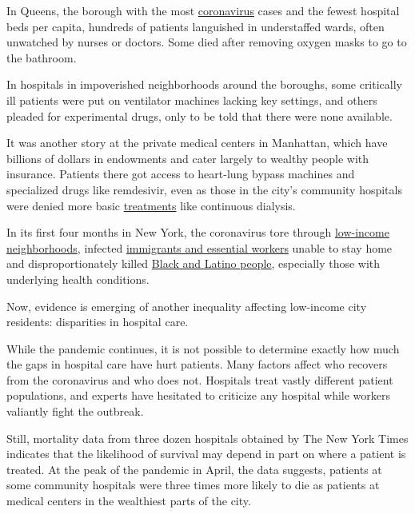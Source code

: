 In Queens, the borough with the most
\href{https://www.nytimes.com/2020/07/27/podcasts/the-daily/new-york-hospitals-covid.html}{coronavirus}
cases and the fewest hospital beds per capita, hundreds of patients
languished in understaffed wards, often unwatched by nurses or doctors.
Some died after removing oxygen masks to go to the bathroom.

In hospitals in impoverished neighborhoods around the boroughs, some
critically ill patients were put on ventilator machines lacking key
settings, and others pleaded for experimental drugs, only to be told
that there were none available.

It was another story at the private medical centers in Manhattan, which
have billions of dollars in endowments and cater largely to wealthy
people with insurance. Patients there got access to heart-lung bypass
machines and specialized drugs like remdesivir, even as those in the
city's community hospitals were denied more basic
\href{https://www.nytimes.com/2020/07/20/world/covid-19-treatment-synairgen-interferon-beta.html}{treatments}
like continuous dialysis.

In its first four months in New York, the coronavirus tore through
\href{https://www.nytimes.com/2020/05/18/nyregion/coronavirus-deaths-nyc.html}{low-income
neighborhoods}, infected
\href{https://www.nytimes.com/2020/04/09/nyregion/coronavirus-queens-corona-jackson-heights-elmhurst.html}{immigrants
and essential workers} unable to stay home and disproportionately killed
\href{https://www.nytimes.com/2020/04/08/nyregion/coronavirus-race-deaths.html}{Black
and Latino people}, especially those with underlying health conditions.

Now, evidence is emerging of another inequality affecting low-income
city residents: disparities in hospital care.

While the pandemic continues, it is not possible to determine exactly
how much the gaps in hospital care have hurt patients. Many factors
affect who recovers from the coronavirus and who does not. Hospitals
treat vastly different patient populations, and experts have hesitated
to criticize any hospital while workers valiantly fight the outbreak.

Still, mortality data from three dozen hospitals obtained by The New
York Times indicates that the likelihood of survival may depend in part
on where a patient is treated. At the peak of the pandemic in April, the
data suggests, patients at some community hospitals were three times
more likely to die as patients at medical centers in the wealthiest
parts of the city.

